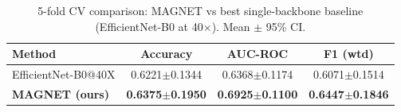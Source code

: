 \begin{table}[h]\centering
\caption{5-fold CV comparison: MAGNET vs best single-backbone baseline (EfficientNet-B0 at 40$\times$). Mean $\pm$ 95\% CI.}
\begin{tabular}{lccc}\hline
Method & Accuracy & AUC-ROC & F1 (wtd) \\\hline
EfficientNet-B0@40X & 0.6221$\pm$0.1344 & 0.6368$\pm$0.1174 & 0.6071$\pm$0.1514 \\
\textbf{MAGNET (ours)} & \textbf{0.6375$\pm$0.1950} & \textbf{0.6925$\pm$0.1100} & \textbf{0.6447$\pm$0.1846} \\
\hline\end{tabular}\label{tab:cv_compare}\end{table}